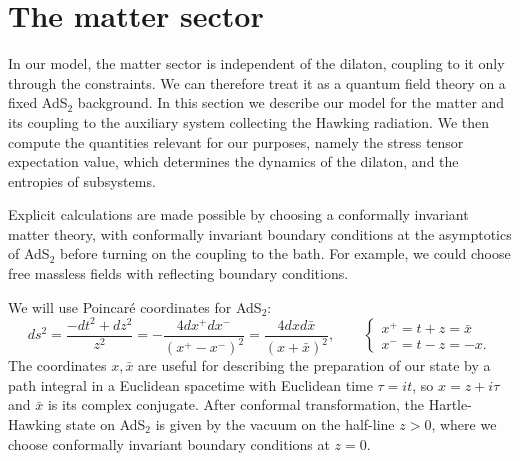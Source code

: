 \documentclass[12pt]{article}
\begin{document}

%





\section{The matter sector}\label{sec:matter}

In our model, the matter sector is independent of the dilaton, coupling to it only through the constraints. We can therefore treat it as a quantum field theory on a fixed AdS$_2$ background. In this section we describe our model for the matter and its coupling to the auxiliary system collecting the Hawking radiation. We then compute the quantities relevant for our purposes, namely the stress tensor expectation value, which determines the dynamics of the dilaton, and the entropies of subsystems.

Explicit calculations are made possible by choosing a conformally invariant matter theory, with conformally invariant boundary conditions at the asymptotics of AdS$_2$ before turning on the coupling to the bath. For example, we could choose free massless fields with reflecting boundary conditions.

We will use Poincar\'e coordinates for AdS$_2$:
\begin{equation}\label{eq:xMetric}
	ds^2 = \frac{-dt^2+dz^2}{z^2}= -\frac{4dx^+dx^-}{(x^+-x^-)^2} = \frac{4dxd\bar{x}}{(x+\bar{x})^2},\qquad \begin{cases}x^+=t+z=\bar{x} \\ x^-=t-z=-x. \end{cases}
\end{equation}
The coordinates $x,\bar{x}$ are useful for describing the preparation of our state by a path integral in a Euclidean spacetime with Euclidean time $\tau=it$, so $x=z+i\tau$ and $\bar{x}$ is its complex conjugate. After conformal transformation, the Hartle-Hawking state on AdS$_2$ is given by the vacuum on the half-line $z>0$, where we choose conformally invariant boundary conditions at $z=0$.
\end{document}
